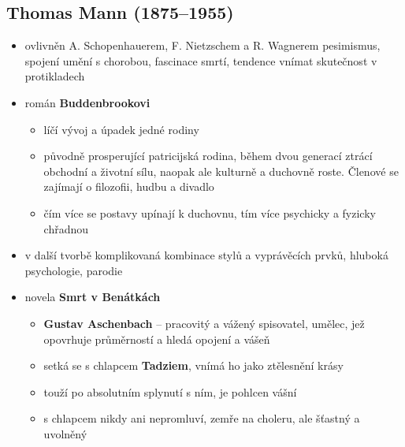 \subsection{Thomas Mann (1875--1955)}
\begin{itemize}
\item ovlivněn A. Schopenhauerem, F. Nietzschem a R. Wagnerem \ra pesimismus, spojení umění s chorobou, fascinace smrtí, tendence vnímat skutečnost v protikladech
\item román \textbf{Buddenbrookovi}
	\begin{itemize}
	\item líčí vývoj a úpadek jedné rodiny
	\item původně prosperující patricijská rodina, během dvou generací ztrácí obchodní a životní sílu, naopak ale kulturně a duchovně roste. Členové se zajímají o filozofii, hudbu a divadlo
	\item čím více se postavy upínají k duchovnu, tím více psychicky a fyzicky chřadnou
	\end{itemize}
\item v další tvorbě komplikovaná kombinace stylů a vyprávěcích prvků, hluboká psychologie, parodie
\item novela \textbf{Smrt v Benátkách}
	\begin{itemize}
	\item \textbf{Gustav Aschenbach} -- pracovitý a vážený spisovatel, umělec, jež opovrhuje průměrností a hledá opojení a vášeň
	\item setká se s chlapcem \textbf{Tadziem}, vnímá ho jako ztělesnění krásy
	\item touží po absolutním splynutí s ním, je pohlcen vášní
	\item s chlapcem nikdy ani nepromluví, zemře na choleru, ale šťastný a uvolněný
	\end{itemize}
\end{itemize}


